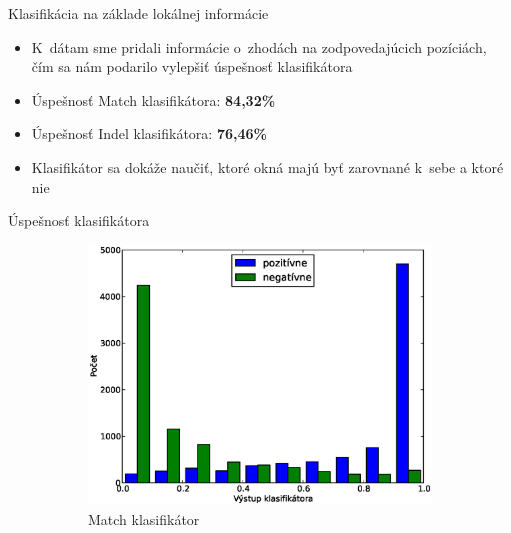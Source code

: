 \documentclass[xcolor=dvipsnames, compress, 12pt]{beamer}
\theoremstyle{definition}
\begin{document}
\begin{frame}{Klasifikácia na základe lokálnej informácie}
  \begin{itemize}
    \item K~dátam sme pridali informácie o~zhodách na zodpovedajúcich pozíciách, čím sa nám podarilo vylepšiť úspešnosť klasifikátora
    \item Úspešnosť Match klasifikátora: \textbf{84,32\%}
    \item Úspešnosť Indel klasifikátora: \textbf{76,46\%}
    \item Klasifikátor sa dokáže naučiť, ktoré okná majú byť zarovnané k~sebe a ktoré nie
\end{itemize}
\end{frame}


\begin{frame}{Úspešnosť klasifikátora}
\begin{figure}[h]
        \centering
        \begin{subfigure}[b]{0.35\textwidth}
               \includegraphics[width=\textwidth]{images/randomforest_combined_5_test}
                \caption{Match klasifikátor}
        \end{subfigure}%
        \qquad\qquad %
        \begin{subfigure}[b]{0.35\textwidth}

\end{subfigure}
\end{figure}
\end{frame}
\end{document}
